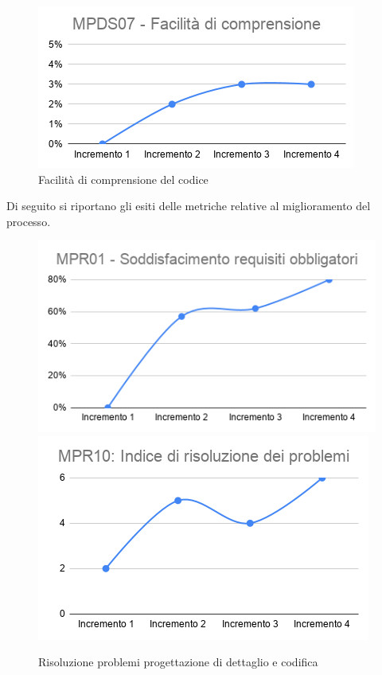 \begin{figure}[h!]
	\centering
	\includegraphics[scale=0.6]{Immagini/MPDS07_FComprensione.png}
	\caption{Facilità di comprensione del codice}
	\label{fig:FacilitàCodice}
\end{figure}

Di seguito si riportano gli esiti delle metriche relative al miglioramento del processo.
\begin{figure}[h!]
	\includegraphics[scale=0.58]{Immagini/MPR01_RObbligatori.png}\quad
	\includegraphics[scale=0.58]{Immagini/MPR10_rproblemidettaglio.png}
	\caption{Risoluzione problemi progettazione di dettaglio e codifica}
	\label{fig:MPR10codifica}
\end{figure}

